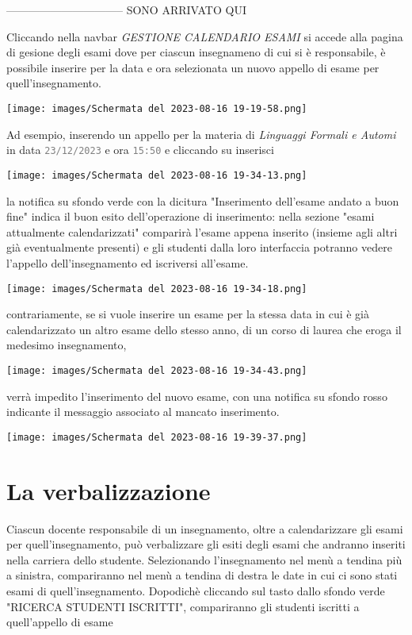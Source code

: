 \documentclass{article}
\newcommand{\attr}[1]{\texttt{\textcolor{gray}{#1}}}
\begin{document}
    -------------------------------- SONO ARRIVATO QUI











    Cliccando nella navbar \textit{GESTIONE CALENDARIO ESAMI} si accede alla pagina di gesione degli esami dove per ciascun insegnameno di cui si è responsabile, è possibile inserire per la data e ora selezionata un nuovo appello di esame per quell'insegnamento.

    \texttt{[image: images/Schermata del 2023-08-16 19-19-58.png]}

    Ad esempio, inserendo un appello per la materia di \textit{Linguaggi Formali e Automi} in data \attr{23/12/2023} e ora \attr{15:50} e cliccando su inserisci

    \texttt{[image: images/Schermata del 2023-08-16 19-34-13.png]}

    la notifica su sfondo verde con la dicitura "Inserimento dell'esame andato a buon fine" indica il buon esito dell'operazione di inserimento: nella sezione "esami attualmente calendarizzati" comparirà l'esame appena inserito (insieme agli altri già eventualmente presenti) e gli studenti dalla loro interfaccia potranno vedere l'appello dell'insegnamento ed iscriversi all'esame.

    \texttt{[image: images/Schermata del 2023-08-16 19-34-18.png]}

    contrariamente, se si vuole inserire un esame per la stessa data in cui è già calendarizzato un altro esame dello stesso anno, di un corso di laurea che eroga il medesimo insegnamento,

    \texttt{[image: images/Schermata del 2023-08-16 19-34-43.png]}

    verrà impedito l'inserimento del nuovo esame, con una notifica su sfondo rosso indicante il messaggio associato al mancato inserimento.

    \texttt{[image: images/Schermata del 2023-08-16 19-39-37.png]}

    \section{La verbalizzazione}
    Ciascun docente responsabile di un insegnamento, oltre a calendarizzare gli esami per quell'insegnamento, può verbalizzare gli esiti degli esami che andranno inseriti nella carriera dello studente.
    Selezionando l'insegnamento nel menù a tendina più a sinistra, compariranno nel menù a tendina di destra le date in cui ci sono stati esami di quell'insegnamento. Dopodichè cliccando sul tasto dallo sfondo verde "RICERCA STUDENTI ISCRITTI", compariranno gli studenti iscritti a quell'appello di esame
\end{document}
